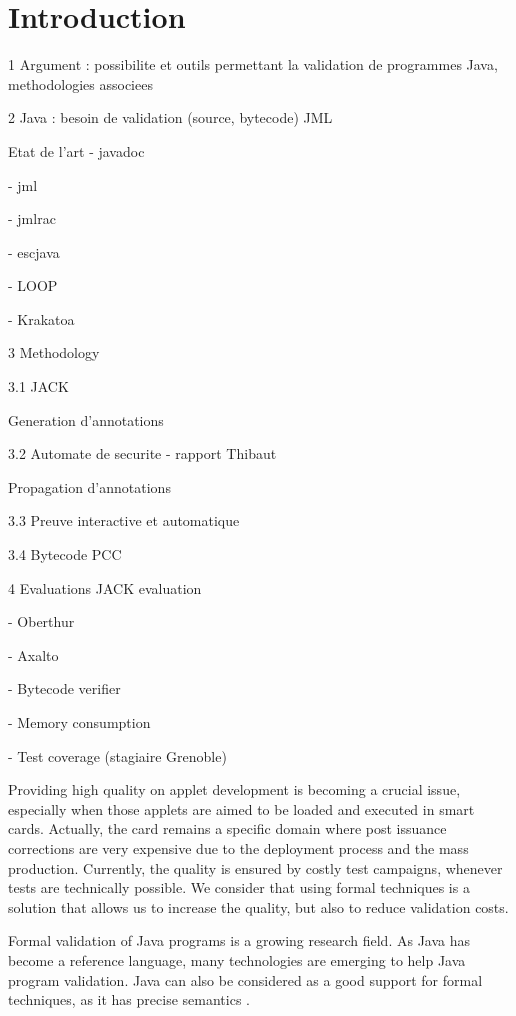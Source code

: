 \chapter{Introduction}

1 Argument : possibilite et outils permettant la validation de programmes Java, methodologies associees

2 Java : besoin de validation (source, bytecode)
  JML

Etat de l'art
- javadoc

- jml

- jmlrac

- escjava

- LOOP

- Krakatoa

3 Methodology

3.1 JACK

    Generation d'annotations

3.2 Automate de securite - rapport Thibaut

    Propagation d'annotations

3.3 Preuve interactive et automatique

3.4 Bytecode PCC

4 Evaluations
JACK evaluation 

	- Oberthur

	- Axalto

	- Bytecode verifier

	- Memory consumption

        - Test coverage (stagiaire Grenoble)


Providing high quality on applet development is becoming a crucial
issue, especially when those applets are aimed to be loaded and executed in smart cards.  Actually, the card
remains a specific domain where post issuance corrections are very expensive due to the deployment process and
the mass production. Currently, the quality is ensured by costly test campaigns, whenever tests are technically
possible. We consider that using formal techniques is a solution that allows us to increase the quality, but
also to reduce validation costs.

 Formal validation of Java programs is a growing research
 field.  As Java has become a reference language, many technologies are
 emerging to help Java program validation.  Java can also be
 considered as a good support for formal techniques, as it has precise semantics \cite{Gosl00a}.

